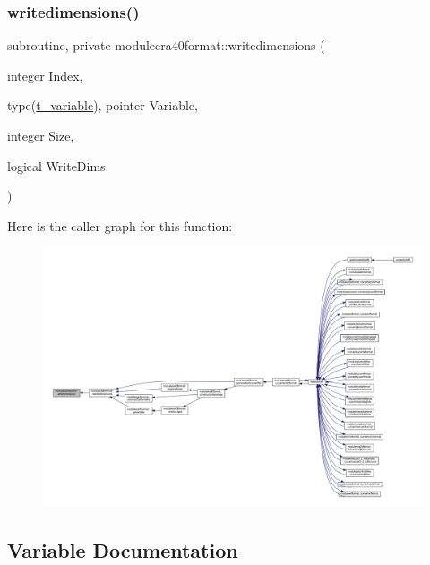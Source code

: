 \subsubsection{\texorpdfstring{writedimensions()}{writedimensions()}}
{\footnotesize\ttfamily subroutine, private moduleera40format\+::writedimensions (\begin{DoxyParamCaption}\item[{integer}]{Index,  }\item[{type(\mbox{\hyperlink{structmoduleera40format_1_1t__variable}{t\+\_\+variable}}), pointer}]{Variable,  }\item[{integer}]{Size,  }\item[{logical}]{Write\+Dims }\end{DoxyParamCaption})\hspace{0.3cm}{\ttfamily [private]}}

Here is the caller graph for this function\+:\nopagebreak
\begin{figure}[H]
\begin{center}
\leavevmode
\includegraphics[width=350pt]{namespacemoduleera40format_aeddab9fd7b3d953ed10b899ae10ef9bb_icgraph}
\end{center}
\end{figure}


\subsection{Variable Documentation}
\mbox{\label{namespacemoduleera40format_a42e5afd967f2051f48175fd48cbcaeab}} 
